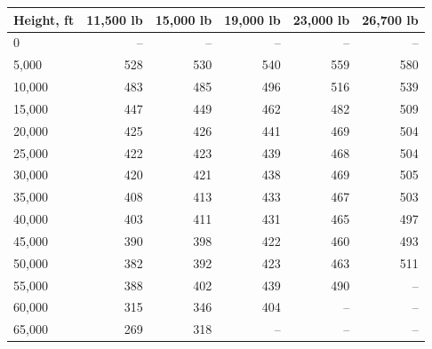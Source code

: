 \begin{tabular}{@{}lrrrrr@{}}
\toprule
Height, ft & 11,500 lb & 15,000 lb & 19,000 lb & 23,000 lb & 26,700 lb \\
\midrule
0 & -- & -- & -- & -- & -- \\
5,000 & 528 & 530 & 540 & 559 & 580 \\
10,000 & 483 & 485 & 496 & 516 & 539 \\
15,000 & 447 & 449 & 462 & 482 & 509 \\
20,000 & 425 & 426 & 441 & 469 & 504 \\
25,000 & 422 & 423 & 439 & 468 & 504 \\
30,000 & 420 & 421 & 438 & 469 & 505 \\
35,000 & 408 & 413 & 433 & 467 & 503 \\
40,000 & 403 & 411 & 431 & 465 & 497 \\
45,000 & 390 & 398 & 422 & 460 & 493 \\
50,000 & 382 & 392 & 423 & 463 & 511 \\
55,000 & 388 & 402 & 439 & 490 & -- \\
60,000 & 315 & 346 & 404 & -- & -- \\
65,000 & 269 & 318 & -- & -- & -- \\
\bottomrule
\end{tabular}
